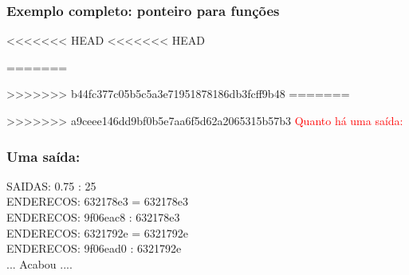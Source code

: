 \begin{frame}[allowframebreaks=0.9, c]

\frametitle{Exemplo completo: ponteiro para funções}

<<<<<<< HEAD
<<<<<<< HEAD

=======

>>>>>>> b44fc377c05b5c5a3e71951878186db3fcff9b48
=======

>>>>>>> a9ceee146dd9bf0b5e7aa6f5d62a2065315b57b3
\textcolor{red}{Quanto há uma saída:}
\end{frame}

\begin{frame}[fragile, c]

\frametitle{Uma saída:}
\begin{block}{}
\begin{small}
SAIDAS:   0.75 : 25\\
ENDERECOS: 632178e3 = 632178e3\\ 
ENDERECOS: 9f06eac8 : 632178e3\\ 
ENDERECOS: 6321792e = 6321792e\\ 
ENDERECOS: 9f06ead0 : 6321792e\\ 
 ... Acabou ....\\
\end{small}
\end{block}
\end{frame}







